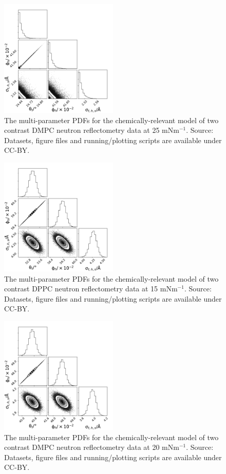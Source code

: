 \documentclass[11pt,a4paper]{paper}
\begin{document}
\begin{figure}[h]
	\centering
	\includegraphics[width=0.50\textwidth]{figures/dmpc_25n_all_corner}
	\caption{The multi-parameter PDFs for the chemically-relevant model of two contrast DMPC neutron reflectometry data at 25 mNm$^{-1}$. Source: Datasets, figure files and running/plotting scripts are available under CC-BY.\cite{mccluskey_2018}}
	\label{fig:dmpcn2}
\end{figure}
\begin{figure}[h]
	\centering
	\includegraphics[width=0.50\textwidth]{figures/dppc_15n_all_corner}
	\caption{The multi-parameter PDFs for the chemically-relevant model of two contrast DPPC neutron reflectometry data at 15 mNm$^{-1}$. Source: Datasets, figure files and running/plotting scripts are available under CC-BY.\cite{mccluskey_2018}}
	\label{fig:dppcn1}
\end{figure}
\begin{figure}[h]
	\centering
	\includegraphics[width=0.50\textwidth]{figures/dppc_20n_all_corner}
	\caption{The multi-parameter PDFs for the chemically-relevant model of two contrast DMPC neutron reflectometry data at 20 mNm$^{-1}$. Source: Datasets, figure files and running/plotting scripts are available under CC-BY.\cite{mccluskey_2018}}
	\label{fig:dppcn2}
\end{figure}

\end{document}
